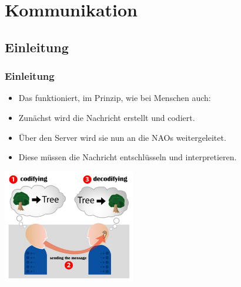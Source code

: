 
\section{Kommunikation}


\subsection{Einleitung}
  
\frame
{
  \frametitle{Einleitung}
  \begin{itemize}
    \item Das funktioniert, im Prinzip, wie bei Menschen auch:
    \item Zun\"achst wird die Nachricht erstellt und codiert.
    \item \"Uber den Server wird sie nun an die NAOs weitergeleitet.
    \item Diese m\"ussen die Nachricht entschl\"usseln und interpretieren.
  \end{itemize}
  
  \begin{center}\includegraphics[height=5cm, center]{Encoding_communication.jpg}\end{center}
}

